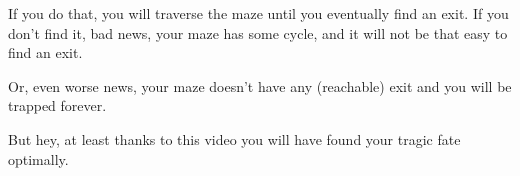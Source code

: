 \documentclass[12pt]{article}
\begin{document}
If you do that, you will traverse the maze until you
eventually find an exit. If you don't find it, bad news,
your maze has some cycle, and it
will not be that easy to find an exit.

Or, even worse news, your maze doesn't have any (reachable) exit
and you will be trapped forever.

But hey, at least thanks to this video you will have found
your tragic fate optimally.

\end{document}
